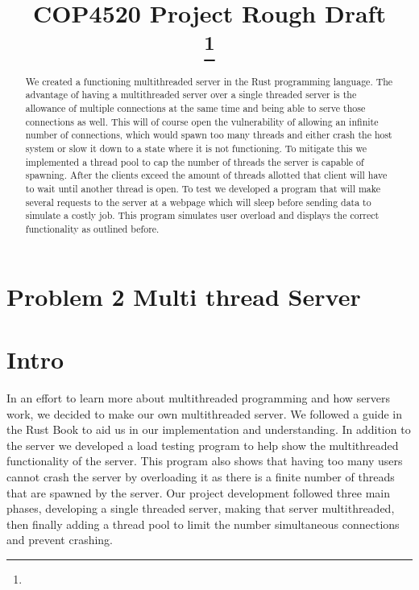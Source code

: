\documentclass[conference]{IEEEtran}
\begin{document}
	
	\title{COP4520 Project Rough Draft\\
		{}
		\thanks{}
	}
	
	\author{
		
		\and
		\and
		\and
	}
	
	\maketitle
\section*{Problem 2 Multi thread Server}
\begin{abstract}
	We created a functioning multithreaded server in the Rust programming language. The advantage of having a multithreaded server over a single threaded server is the allowance of multiple connections at the same time and being able to serve those connections as well. This will of course open the vulnerability of allowing an infinite number of connections, which would spawn too many threads and either crash the host system or slow it down to a state where it is not functioning. To mitigate this we implemented a thread pool to cap the number of threads the server is capable of spawning. After the clients exceed the amount of threads allotted that client will have to wait until another thread is open. To test we developed a program that will make several requests to the server at a webpage which will sleep before sending data to simulate a costly job. This program simulates user overload and displays the correct functionality as outlined before.
\end{abstract}
\section{Intro}
In an effort to learn more about multithreaded programming and how servers work, we decided to make our own multithreaded server. We followed a guide in the Rust Book to aid us in our implementation and understanding. In addition to the server we developed a load testing program to help show the multithreaded functionality of the server. This program also shows that having too many users cannot crash the server by overloading it as there is a finite number of threads that are spawned by the server. Our project development followed three main phases, developing a single threaded server, making that server multithreaded, then finally adding a thread pool to limit the number simultaneous connections and prevent crashing.
\end{document}
